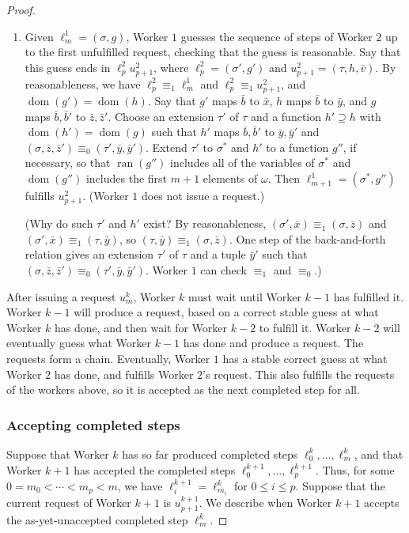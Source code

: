 \documentclass[10pt,a4paper]{article}
\DeclareMathOperator{\dom}{dom}
\DeclareMathOperator{\ran}{ran}
\theoremstyle{definition}
\begin{document}
\begin{proof}
\begin{enumerate}
			\item Given $\ell^1_m = (\sigma,g)$, Worker $1$ guesses the sequence of steps of Worker $2$ up to the first unfulfilled request, checking that the guess is reasonable. Say that this guess ends in $\ell^2_p u^2_{p+1}$, where $\ell^2_p = (\sigma',g')$ and $u^2_{p+1} = (\tau,h,\bar{v})$. By reasonableness, we have $\ell^2_p\equiv_1\ell^1_m$ and $\ell^2_p\equiv_1 u^2_{p+1}$, and $\dom(g')=\dom(h)$. Say that $g'$ maps $\bar{b}$ to $\bar{x}$, $h$ maps $\bar{b}$ to $\bar{y}$, and $g$ maps $\bar{b},\bar{b}'$ to $\bar{z},\bar{z}'$. Choose an extension $\tau'$ of $\tau$ and a function $h'\supseteq h$ with $\dom(h')=\dom(g)$ such that $h'$ maps $\bar{b},\bar{b}'$ to $\bar{y},\bar{y}'$ and $(\sigma,\bar{z},\bar{z}')\equiv_0(\tau',\bar{y},\bar{y}')$. Extend $\tau'$ to $\sigma^*$ and $h'$ to a function $g''$, if necessary, so that $\ran(g'')$ includes all of the variables of $\sigma^*$ and $\dom(g'')$ includes the first $m+1$ elements of $\omega$. Then $\ell^1_{m+1}=(\sigma^*,g'')$ fulfills $u^2_{p+1}$. (Worker $1$ does not issue a request.) \par (Why do such $\tau'$ and $h'$ exist? By reasonableness, $(\sigma',\bar{x})\equiv_1(\sigma,\bar{z})$ and $(\sigma',\bar{x})\equiv_1(\tau,\bar{y})$, so $(\tau,\bar{y})\equiv_1(\sigma,\bar{z})$. One step of the back-and-forth relation gives an extension $\tau'$ of $\tau$ and a tuple $\bar{y}'$ such that $(\sigma,\bar{z},\bar{z}')\equiv_0(\tau',\bar{y},\bar{y}')$. Worker $1$ can check $\equiv_1$ and $\equiv_0$.)
			
		\end{enumerate}
		
		After issuing a request $u^k_m$, Worker $k$ must wait until Worker $k-1$ has fulfilled it. Worker $k-1$ will produce a request, based on a correct stable guess at what Worker $k$ has done, and then wait for Worker $k-2$ to fulfill it. Worker $k-2$ will eventually guess what Worker $k-1$ has done and produce a request. The requests form a chain. Eventually, Worker $1$ has a stable correct guess at what Worker $2$ has done, and fulfills Worker $2$'s request. This also fulfills the requests of the workers above, so it is accepted as the next completed step for all. 
		

			\subsubsection{Accepting completed steps}
			
			Suppose that Worker $k$ has so far produced completed steps
			$\ell^k_0,\ldots,\ell^k_m$, and that Worker $k+1$ has accepted the
			completed steps $\ell^{k+1}_0,\ldots,\ell^{k+1}_p$. Thus, for some
			$0=m_0<\cdots<m_p<m$, we have
			$\ell^{k+1}_i=\ell^k_{m_i}$ for $0\leq i\leq p$. Suppose that the
			current request of Worker $k+1$ is $u^{k+1}_{p+1}$. We describe when
			Worker $k+1$ accepts the as-yet-unaccepted completed step
			$\ell^k_m$.
			

\end{proof}
\end{document}
